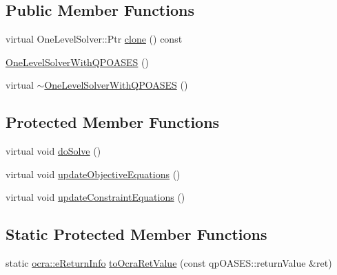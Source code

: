 \subsection*{Public Member Functions}
\begin{DoxyCompactItemize}
\item 
virtual One\+Level\+Solver\+::\+Ptr \hyperlink{classocra_1_1OneLevelSolverWithQPOASES_a7934afdc2e1104437b3eab05e5acb3d0}{clone} () const 
\item 
\hyperlink{classocra_1_1OneLevelSolverWithQPOASES_a5540c732d87204ed0779b3fbaa5667b7}{One\+Level\+Solver\+With\+Q\+P\+O\+A\+S\+ES} ()
\item 
virtual \hyperlink{classocra_1_1OneLevelSolverWithQPOASES_adf42bcbdf5c169be4fe51c025ed49c53}{$\sim$\+One\+Level\+Solver\+With\+Q\+P\+O\+A\+S\+ES} ()
\end{DoxyCompactItemize}
\subsection*{Protected Member Functions}
\begin{DoxyCompactItemize}
\item 
virtual void \hyperlink{classocra_1_1OneLevelSolverWithQPOASES_aa2d1343a6e0f5c8913496c3384c0cd40}{do\+Solve} ()
\item 
virtual void \hyperlink{classocra_1_1OneLevelSolverWithQPOASES_a6a0e2cdfe22731fde09af26442a9cc85}{update\+Objective\+Equations} ()
\item 
virtual void \hyperlink{classocra_1_1OneLevelSolverWithQPOASES_abbe458ba193d545d6c07b09f582d6ce7}{update\+Constraint\+Equations} ()
\end{DoxyCompactItemize}
\subsection*{Static Protected Member Functions}
\begin{DoxyCompactItemize}
\item 
static \hyperlink{namespaceocra_aa1d873ac30cb0a0f79ba978745de294b}{ocra\+::e\+Return\+Info} \hyperlink{classocra_1_1OneLevelSolverWithQPOASES_a8fa99c1dbded56a7ecc69a3d756f1277}{to\+Ocra\+Ret\+Value} (const qp\+O\+A\+S\+E\+S\+::return\+Value \&ret)
\end{DoxyCompactItemize}
